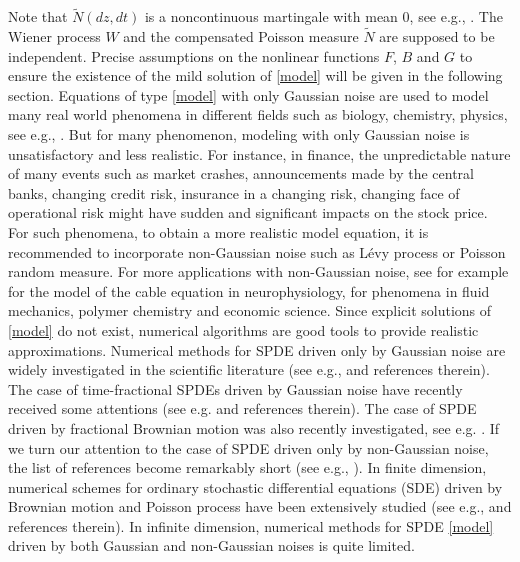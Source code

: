 \documentclass[review,12pt]{elsarticle}
\begin{document}
 Note that $\widetilde{N}(dz, dt)$ is a noncontinuous martingale with mean $0$, see e.g., \cite{Rudiger}. The Wiener process $W$ and the compensated Poisson measure $\widetilde{N}$ are supposed to be independent. Precise assumptions on the nonlinear functions $F$, $B$ and $G$ to ensure the existence of the mild solution of \eqref{model} will be given in the following section.
Equations of type \eqref{model} with only Gaussian noise   are used to model many real world phenomena in different fields such as   biology, chemistry, physics, see e.g.,  \cite{ATthesis,Shardlow,SebaGatam}. But for many phenomenon, modeling with only Gaussian noise is unsatisfactory and  less realistic. For instance, in finance, the unpredictable nature of many events such as market crashes, announcements made by the central banks,  changing    credit risk, insurance in a changing risk, changing face of operational risk \cite{Tankov, Platen1} might have sudden and significant impacts on the stock price. For such phenomena, to obtain a more realistic model equation, it is recommended to incorporate non-Gaussian noise such as L\'{e}vy process or Poisson random measure. For  more applications   with non-Gaussian noise, see  for example \cite[Chapter 3]{Walsh} for the model of the cable equation in neurophysiology, \cite{Levy} for phenomena in fluid mechanics, polymer chemistry and economic science. %
        Since explicit solutions of \eqref{model}  do not  exist, numerical algorithms are  good tools to provide realistic approximations. Numerical methods for SPDE driven only by Gaussian noise are widely investigated in the scientific literature (see e.g., \cite{Jentzen1,Jentzen2,Gaby1,Kovac1,Raphael,Antonio1, AntonioRev1,AntonioRev2,Xiaojie2,Xiaojie3,Yan2} and references therein). The case of time-fractional SPDEs driven by Gaussian noise have recently received some attentions (see e.g. \cite{Zou1,Zou2} and references therein). The case of SPDE driven by fractional Brownian motion was also recently investigated, see e.g. \cite{XiaojieRev1}.  If we turn our attention to the case of SPDE driven only by non-Gaussian noise, the list of references become remarkably short (see e.g., \cite{Barth1,Barth2,Barth3,Erika3,Erika2,Erika1}). 
        In finite dimension, numerical schemes for  ordinary stochastic  differential equations (SDE) driven by Brownian motion and Poisson process have been extensively studied (see e.g., \cite{Bruti1,Darelotis1,Kloeden1,Kumar,Platen1,Gan} and references therein).  In  infinite dimension, numerical methods for SPDE  \eqref{model} driven by both Gaussian and non-Gaussian noises is quite limited.  
\end{document}

